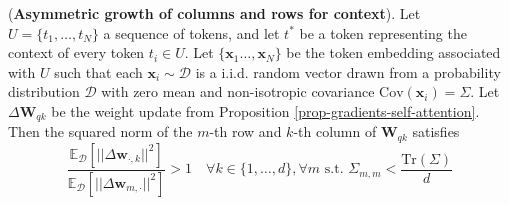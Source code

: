 \begin{proposition}
\label{prop-gradient-asymmetric-growth-rows-columns}
%
(\textbf{Asymmetric growth of columns and rows for context}).
%
Let $U = \{t_1, \dots, t_N\}$ a sequence of tokens, and let $t^*$ be a token representing the context of every token $t_i \in U$.
%
Let $\{\bm{x}_1 \dots, \bm{x}_N\}$ be the token embedding associated with $U$ such that each $\bm{x}_i \sim \mathcal{D}$ is a i.i.d. random vector drawn from a probability distribution $\mathcal{D}$ with zero mean and non-isotropic covariance $\text{Cov}(\bm{x}_i)  = \Sigma$.
%
Let $\Delta \bm{W}_{qk}$ be the weight update from Proposition \ref{prop-gradients-self-attention}.
%
Then the squared norm of the $m$-th row and $k$-th column of $\bm{W}_{qk}$ satisfies
%
\begin{equation}
\frac{\mathbb{E}_{\mathcal{D}}\left[ ||\Delta \bm{w}_{\cdot, k}||^2 \right]}{\mathbb{E}_{\mathcal{D}}\left[ ||\Delta \bm{w}_{m, \cdot}||^2 \right]} > 1 \quad \forall k \in \{1,\dots,d\}, \forall m \,\,\text{s.t.} \,\, \Sigma_{m,m} < \frac{\text{Tr}(\Sigma)}{d}
\end{equation}
%
\end{proposition}